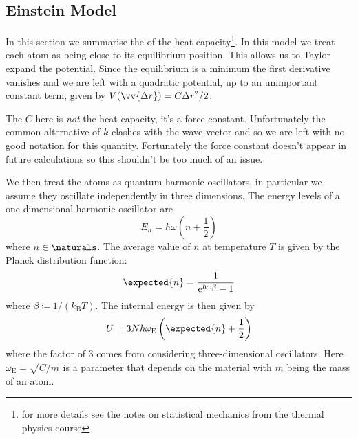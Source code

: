 \documentclass[fleqn]{NotesClass}
\newcommand*{\boltzmann}{k_{\mathrm{B}}}
\newcommand*{\e}{\mathrm{e}}
\newcommand*{\einstein}{\mathrm{E}}
\begin{document}
    \subsection{Einstein Model}
    In this section we summarise the  of the heat capacity\footnote{for more details see the notes on statistical mechanics from the thermal physics course}.
    In this model we treat each atom as being close to its equilibrium position.
    This allows us to Taylor expand the potential.
    Since the equilibrium is a minimum the first derivative vanishes and we are left with a quadratic potential, up to an unimportant constant term, given by \(V(\vv{\Delta r}) = C\Delta r^2/2\).
    \begin{wrn}
        The \(C\) here is \emph{not} the heat capacity, it's a force constant.
        Unfortunately the common alternative of \(k\) clashes with the wave vector and so we are left with no good notation for this quantity.
        Fortunately the force constant doesn't appear in future calculations so this shouldn't be too much of an issue.
    \end{wrn}

    We then treat the atoms as quantum harmonic oscillators, in particular we assume they oscillate independently in three dimensions.    
    The energy levels of a one-dimensional harmonic oscillator are
    \begin{equation}
        E_n = \hbar\omega\left( n + \frac{1}{2} \right)
    \end{equation}
    where \(n \in \naturals\).
    The average value of \(n\) at temperature \(T\) is given by the Planck distribution function:
    \begin{equation}
        \expected{n} = \frac{1}{\e^{\hbar\omega\beta} - 1}
    \end{equation}
    where \(\beta \coloneqq 1/(\boltzmann T)\).
    The internal energy is then given by
    \begin{equation}
        U = 3N\hbar\omega_{\einstein}\left( \expected{n} + \frac{1}{2} \right)
    \end{equation}
    where the factor of 3 comes from considering three-dimensional oscillators.
    Here \(\omega_{\einstein} = \sqrt{C/m}\) is a parameter that depends on the material with \(m\) being the mass of an atom.
    
\end{document}
